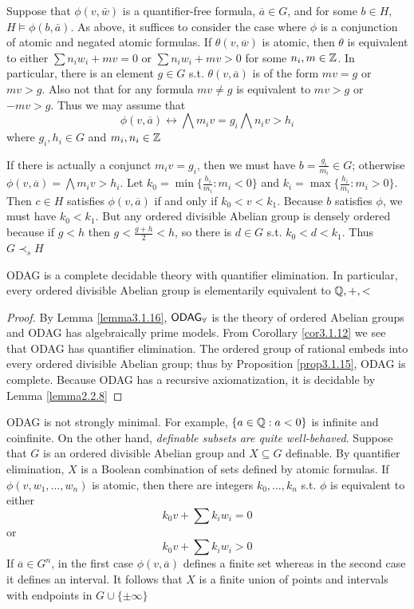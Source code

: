 \documentclass[11pt]{article}
\begin{document}
Suppose that \(\phi(v,\bar{w})\) is a quantifier-free formula,
\(\overbar{a}\in G\), and for some \(b\in H\), \(H\vDash\phi(b,\bar{a})\).
As above, it suffices to consider the case where \(\phi\) is a conjunction of
atomic and negated atomic formulas. If \(\theta(v,\overbar{w})\) is atomic,
then \(\theta\) is equivalent to either \(\sum n_iw_i+mv=0\) or
\(\sum n_iw_i+mv>0\) for some \(n_i,m\in\mathbb{Z}\). In particular, there is an
element \(g\in G\) s.t. \(\theta(v,\overbar{a})\) is of the form \(mv=g\) or
\(mv>g\). Also not that for any formula \(mv\neq g\) is equivalent to
\(mv>g\) or \(-mv>g\). Thus we may assume that
\begin{equation*}
\phi(v,\overbar{a})\leftrightarrow\bigwedge m_iv=g_i
\bigwedge n_iv>h_i
\end{equation*}
where \(g_i,h_i\in G\) and \(m_i,n_i\in\mathbb{Z}\)

If there is actually a conjunct \(m_iv=g_i\), then we must have
\(b=\frac{g_i}{m_i}\in G\); otherwise
\(\phi(v,\overbar{a})=\bigwedge m_iv>h_i\). Let
\(k_0=\min\{\frac{h_i}{m_i}:m_i<0\}\) and
\(k_i=\max\{\frac{h_i}{m_i}:m_i>0\}\). Then \(c\in H\) satisfies
\(\phi(v,\overbar{a})\) if and only if \(k_0<v<k_1\). Because \(b\)
satisfies \(\phi\), we must have \(k_0<k_1\). But any ordered divisible Abelian
group is densely ordered because if \(g<h\) then \(g<\frac{g+h}{2}<h\), so
there is \(d\in G\) s.t. \(k_0<d<k_1\). Thus \(G\prec_s H\)

\begin{corollary}[]
\label{cor3.1.17}
ODAG is a complete decidable theory with quantifier elimination. In
particular, every ordered divisible Abelian group is elementarily equivalent
to \(\mathbb{Q},+,<\)
\end{corollary}

\begin{proof}
By Lemma \ref{lemma3.1.16}, \(\operatorname{\textsf{ODAG}}_\forall\) is the theory of ordered Abelian
groups and ODAG has algebraically prime models. From Corollary \ref{cor3.1.12}
we see that ODAG has quantifier elimination. The ordered group of rational
embeds into every ordered divisible Abelian group; thus by Proposition
\ref{prop3.1.15}, ODAG is complete. Because ODAG has a recursive
axiomatization, it is decidable by Lemma \ref{lemma2.2.8}
\end{proof}

ODAG is not strongly minimal. For example, \(\{a\in\mathbb{Q}:a<0\}\) is infinite
and coinfinite. On the other hand, \emph{definable subsets are quite
well-behaved}. Suppose that \(G\) is an ordered divisible Abelian group and
\(X\subseteq G\) definable. By quantifier elimination, \(X\) is a Boolean
combination of sets defined by atomic formulas. If \(\phi(v,w_1,\dots,w_n)\)
is atomic, then there are integers \(k_0,\dots,k_n\) s.t. \(\phi\) is equivalent
to either
\begin{equation*}
k_0v+\sum k_iw_i=0
\end{equation*}
or
\begin{equation*}
k_0v+\sum k_iw_i>0
\end{equation*}
If \(\overbar{a}\in G^n\), in the first case \(\phi(v,\overbar{a})\) defines
a finite set whereas in the second case it defines an interval. It follows
that \(X\) is a finite union of points and intervals with endpoints in
\(G\cup\{\pm\infty\}\)
\end{document}
